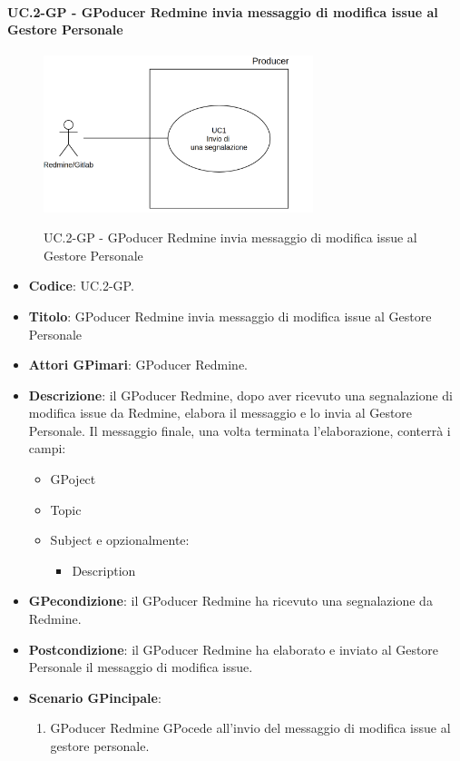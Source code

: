 		\paragraph{UC\theuccount.2-GP - GPoducer Redmine invia messaggio di modifica issue al Gestore Personale}
			\begin{figure}[H]
				\centering
				\includegraphics[width=0.7\textwidth]{img/UC1.png}\\
				\caption{UC\theuccount.2-GP - GPoducer Redmine invia messaggio di modifica issue al Gestore Personale}
			\end{figure}
			\begin{itemize}
				\item \textbf{Codice}: UC\theuccount.2-GP.
				\item \textbf{Titolo}: GPoducer Redmine invia messaggio di modifica issue al Gestore Personale
				\item \textbf{Attori GPimari}: GPoducer Redmine.
				\item \textbf{Descrizione}: il GPoducer Redmine, dopo aver
				ricevuto una segnalazione di modifica issue da Redmine, elabora
				il messaggio e lo invia al Gestore Personale.
				Il messaggio finale, una volta terminata l'elaborazione, conterrà i campi:
				\begin{itemize}
					\item GPoject
					\item Topic
					\item Subject e opzionalmente:
					\begin{itemize}
						\item Description
					\end{itemize}
				\end{itemize}
				\item \textbf{GPecondizione}: il GPoducer Redmine ha ricevuto una segnalazione da Redmine.
				\item \textbf{Postcondizione}: il GPoducer Redmine ha elaborato e inviato al Gestore Personale il messaggio di modifica issue.
				\item \textbf{Scenario GPincipale}: 
				\begin{enumerate}
					\item GPoducer Redmine GPocede all'invio del messaggio di
					modifica issue al gestore personale.
				\end{enumerate}
				
			\end{itemize}